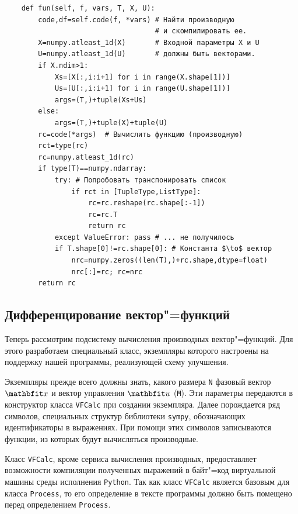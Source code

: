 \documentclass[a4paper,14pt, openany, twoside, final]{extbook} %
\begin{document}
\begin{verbatim}
    def fun(self, f, vars, T, X, U):
        code,df=self.code(f, *vars) # Найти производную
                                    # и скомпилировать ее.
        X=numpy.atleast_1d(X)       # Входной параметры X и U
        U=numpy.atleast_1d(U)       # должны быть векторами.
        if X.ndim>1:
            Xs=[X[:,i:i+1] for i in range(X.shape[1])]
            Us=[U[:,i:i+1] for i in range(U.shape[1])]
            args=(T,)+tuple(Xs+Us)
        else:
            args=(T,)+tuple(X)+tuple(U)
        rc=code(*args)  # Вычислить функцию (производную)
        rct=type(rc)
        rc=numpy.atleast_1d(rc)
        if type(T)==numpy.ndarray:
            try: # Попробовать транспонировать список
                if rct in [TupleType,ListType]:
                    rc=rc.reshape(rc.shape[:-1])
                    rc=rc.T
                    return rc
            except ValueError: pass # ... не получилось
            if T.shape[0]!=rc.shape[0]: # Константа $\to$ вектор
                nrc=numpy.zeros((len(T),)+rc.shape,dtype=float)
                nrc[:]=rc; rc=nrc
        return rc
\end{verbatim}

\subsection{Дифференцирование вектор"=функций}
\label{sec:VFdiff}

Теперь рассмотрим подсистему вычисления производных вектор"=функций.  Для этого разработаем специальный класс, экземпляры которого настроены на поддержку нашей программы, реализующей схему улучшения.

Экземпляры прежде всего должны знать, какого размера \texttt{N} фазовый вектор $\vecx$ и вектор управления $\vecu$ (\texttt{M}).  Эти параметры передаются в конструктор класса \texttt{VFCalc} при создании экземпляра.  Далее порождается ряд символов, специальных структур библиотеки \texttt{sympy}, обозначающих идентификаторы в выражениях.  При помощи этих символов записываются функции, из которых будут вычисляться производные.

Класс \texttt{VFCalc}, кроме сервиса вычисления производных, предоставляет возможности компиляции полученных выражений в байт"=код виртуальной машины среды исполнения \texttt{Python}.  Так как класс \texttt{VFCalc} является базовым для класса \texttt{Process}, то его определение в тексте программы должно быть помещено перед определением \texttt{Process}.
\end{document}
